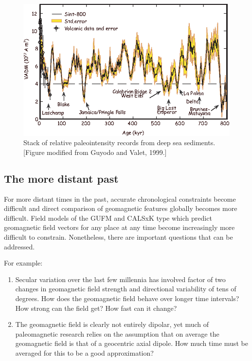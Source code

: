 \begin{figure}[htb]
\centering  \includegraphics[width=13 cm]{EPSfiles/sint800.eps}
\caption{Stack of relative  paleointensity records from deep sea sediments.  [Figure  modified  from Guyodo and Valet, 1999.] } 
\label{fig:sint800}
\end{figure}\nocite{guyodo99}



\subsection{The more distant past}



For more distant times in the past, accurate chronological constraints become difficult and direct comparison of geomagnetic features globally becomes more difficult.   Field models of the GUFM and CALSxK type which predict geomagnetic field vectors for any place at any time become increasingly more difficult to constrain.  Nonetheless, there are important questions that can be addressed.  


For example: 
\begin{enumerate}
\item  Secular variation over the last few millennia has involved factor of two changes in geomagnetic field strength and directional variability of tens of degrees.  How does the geomagnetic field behave over longer time intervals?  How strong can the field get?  How fast can it change?
\item The geomagnetic field is clearly not entirely dipolar, yet much of paleomagnetic research relies on the assumption that on average the geomagnetic field is that of a geocentric axial dipole. How much time must be averaged for this to be a good approximation?  
\end{enumerate}


